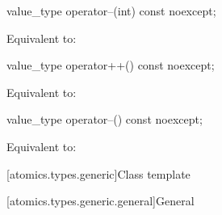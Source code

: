 %
%
\begin{itemdecl}
value_type operator--(int) const noexcept;
\end{itemdecl}

\begin{itemdescr}
\pnum
\effects
Equivalent to: 
\end{itemdescr}

%
%
\begin{itemdecl}
value_type operator++() const noexcept;
\end{itemdecl}

\begin{itemdescr}
\pnum
\effects
Equivalent to: 
\end{itemdescr}

%
%
\begin{itemdecl}
value_type operator--() const noexcept;
\end{itemdecl}

\begin{itemdescr}
\pnum
\effects
Equivalent to: 
\end{itemdescr}

[atomics.types.generic]{Class template }

[atomics.types.generic.general]{General}


